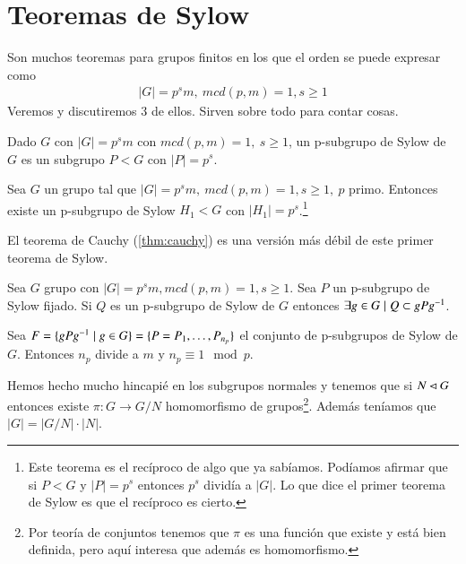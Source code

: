 
\section{Teoremas de Sylow}

Son muchos teoremas para grupos finitos en los que el orden se puede expresar como
\begin{align}
	|G| = p^s m,\ mcd(p, m) = 1, s \geq 1
\end{align}
Veremos y discutiremos 3 de ellos. Sirven sobre todo para contar cosas.

\begin{dfn}
	Dado $G$ con $|G| = p^sm$ con $mcd(p,m) = 1,\ s \geq 1$, un p-subgrupo de Sylow de $G$ es un subgrupo $P < G$ con $|P| = p^s$.
\end{dfn}

\begin{thm}
	\label{thm:sylow1}
	Sea $G$ un grupo tal que $|G| = p^s m,\ mcd(p, m) = 1, s \geq 1,\ p$ primo. Entonces existe un p-subgrupo de Sylow $H_1 < G$ con $|H_1| = p^s$.\footnote{Este teorema es el recíproco de algo que ya sabíamos. Podíamos afirmar que si $P < G$ y $|P| = p^s$ entonces $p^s$ dividía a $|G|$. Lo que dice el primer teorema de Sylow es que el recíproco es cierto.}
\end{thm}

El teorema de Cauchy (\ref{thm:cauchy}) es una versión más débil de este primer teorema de Sylow.

\begin{thm}
	\label{thm:sylow2}
	Sea $G$ grupo con $|G| = p^s m, mcd(p, m) = 1, s \geq 1$. Sea $P$ un p-subgrupo de Sylow fijado. Si $Q$ es un p-subgrupo de Sylow de $G$ entonces $\exists g \in G \mid Q \subset gPg^{-1}$.
\end{thm}

\begin{thm}
	\label{thm:sylow3}
	Sea $F = \{g P g^{-1} \mid g \in G \} = \{P = P_{1}, \dots, P_{n_p}\}$ el conjunto de p-subgrupos de Sylow de $G$. Entonces $n_p$ divide a $m$ y $n_p \equiv 1 \mod p$.
\end{thm}

Hemos hecho mucho hincapié en los subgrupos normales y tenemos que si $N \lhd G$ entonces existe $\pi:G \to G/N$ homomorfismo de grupos\footnote{Por teoría de conjuntos tenemos que $\pi$ es una función que existe y está bien definida, pero aquí interesa que además es homomorfismo.}. Además teníamos que $|G| = |G/N| \cdot |N|$.

